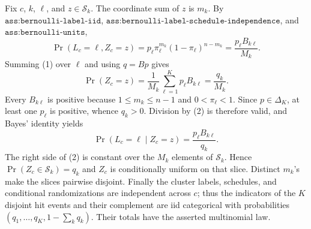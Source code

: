 Fix \(c\), \(k\), \(\ell\), and \(z\in\mathcal S_k\).  The coordinate sum of \(z\) is \(m_k\).  By \(\texttt{ass:bernoulli-label-iid}\), \(\texttt{ass:bernoulli-label-schedule-independence}\), and \(\texttt{ass:bernoulli-units}\),
\[
 \Pr(L_c=\ell,Z_c=z)
 =p_\ell\pi_\ell^{m_k}(1-\pi_\ell)^{n-m_k}
 =\frac{p_\ell B_{k\ell}}{M_k}. \tag{1}
\]
Summing (1) over \(\ell\) and using \(q=Bp\) gives
\[
 \Pr(Z_c=z)=\frac1{M_k}\sum_{\ell=1}^Kp_\ell B_{k\ell}=\frac{q_k}{M_k}. \tag{2}
\]
Every \(B_{k\ell}\) is positive because \(1\leq m_k\leq n-1\) and \(0<\pi_\ell<1\).  Since \(p\in\Delta_K\), at least one \(p_\ell\) is positive, whence \(q_k>0\).  Division by (2) is therefore valid, and Bayes' identity yields
\[
 \Pr(L_c=\ell\mid Z_c=z)=\frac{p_\ell B_{k\ell}}{q_k}. \tag{3}
\]
The right side of (2) is constant over the \(M_k\) elements of \(\mathcal S_k\).  Hence \(\Pr(Z_c\in\mathcal S_k)=q_k\) and \(Z_c\) is conditionally uniform on that slice.  Distinct \(m_k\)'s make the slices pairwise disjoint.  Finally the cluster labels, schedules, and conditional randomizations are independent across \(c\); thus the indicators of the \(K\) disjoint hit events and their complement are iid categorical with probabilities \((q_1,\ldots,q_K,1-\sum_kq_k)\).  Their totals have the asserted multinomial law.
